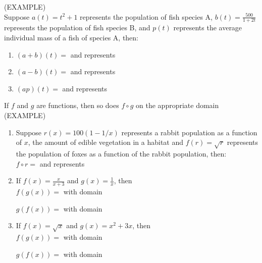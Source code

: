 \documentclass[11pt]{article}
\begin{document}
(EXAMPLE) \\

Suppose $a(t) = t^2 + 1$ represents the population of fish species A, $b(t) = \frac{500}{1+2t}$ represents the population of fish species B, and $p(t)$ represents the average individual mass of a fish of species A, then: \\

\begin{enumerate}
\item{$(a+b)(t) = $ \hspace{2in} and represents }
\item{$(a-b)(t) = $ \hspace{2in} and represents }
\item{$(ap)(t) = $ \hspace{2in} and represents }
  \end{enumerate}


If $f$ and $g$ are functions, then so does $f\circ g$ on the appropriate domain
\\

(EXAMPLE) \\
\begin{enumerate}
  \item{
Suppose $r(x) = 100(1-1/x)$ represents a rabbit population as a function of $x$, the amount of edible vegetation in a habitat and
$f(r) = \sqrt{r}$ represents the population of foxes as a function of the rabbit population, then: \\

$f\circ r = $ \hspace{2in} and represents
  }

    \vspace{0.5in}
    
  \item{ If $f(x) = \frac{x}{x+3}$ and $g(x) = \frac{1}{x}$, then \\
    $f(g(x)) = $  \hspace{2in} with domain \\ 

    \vspace{0.5in}
    
    $g(f(x)) = $  \hspace{2in} with domain \\
    
  }

    \vspace{0.5in}
    
  \item{ If $f(x) = \sqrt{x}$ and $g(x) = x^2+3x$, then \\
    $f(g(x)) = $  \hspace{2in} with domain \\ 

    \vspace{0.5in}
    
    $g(f(x)) = $  \hspace{2in} with domain \\
    
    }

\end{enumerate}
\end{document}
